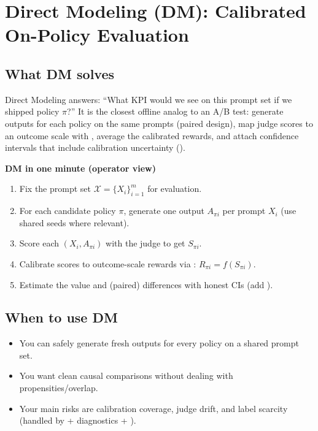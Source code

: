 \section{Direct Modeling (DM): Calibrated On-Policy Evaluation}

\subsection{What DM solves}

Direct Modeling answers: ``What KPI would we see on this prompt set if we shipped policy $\pi$?'' It is the closest offline analog to an A/B test: generate outputs for each policy on the same prompts (paired design), map judge scores to an outcome scale with \autocal, average the calibrated rewards, and attach confidence intervals that include calibration uncertainty (\oua).

\begin{quickref}
\textbf{DM in one minute (operator view)}
\begin{enumerate}
\item Fix the prompt set $\mathcal{X} = \{X_i\}_{i=1}^m$ for evaluation.
\item For each candidate policy $\pi$, generate one output $A_{\pi i}$ per prompt $X_i$ (use shared seeds where relevant).
\item Score each $(X_i, A_{\pi i})$ with the judge to get $S_{\pi i}$.
\item Calibrate scores to outcome-scale rewards via \autocal: $R_{\pi i} = f(S_{\pi i})$.
\item Estimate the value and (paired) differences with honest CIs (add \oua).
\end{enumerate}
\end{quickref}

\subsection{When to use DM}

\begin{itemize}
\item You can safely generate fresh outputs for every policy on a shared prompt set.
\item You want clean causal comparisons without dealing with propensities/overlap.
\item Your main risks are calibration coverage, judge drift, and label scarcity (handled by \autocal{} + diagnostics + \oua).
\end{itemize}

